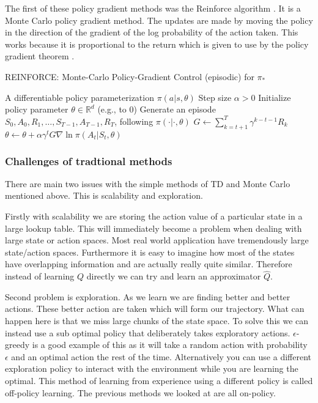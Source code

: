 The first of these policy gradient methods was the Reinforce algorithm \cite{williamsSimpleStatisticalGradientfollowing1992}. It is a Monte Carlo policy gradient method. The updates are made by moving the policy in the direction of the gradient of the log probability of the action taken. This works because it is proportional to the return which is given to use by the policy gradient theorem \cite{suttonPolicyGradientMethods1999}.

\begin{algorithm}
\caption{REINFORCE: Monte-Carlo Policy-Gradient Control (episodic) for $\pi_*$}
\begin{algorithmic}[1]
\Require A differentiable policy parameterization $\pi(a|s, \theta)$
\Require Step size $\alpha > 0$
\State Initialize policy parameter $\theta \in \mathbb{R}^d$ (e.g., to 0)
\Loop
  \State Generate an episode $S_0, A_0, R_1, \ldots, S_{T-1}, A_{T-1}, R_T$, following $\pi(\cdot|\cdot, \theta)$
    \State $G \leftarrow \sum_{k=t+1}^{T} \gamma^{k-t-1} R_k$
    \State $\theta \leftarrow \theta + \alpha \gamma^t G \nabla \ln \pi(A_t|S_t, \theta)$
  \EndFor
\EndLoop
\end{algorithmic}
\end{algorithm}

\subsubsection{Challenges of tradtional methods}

There are main two issues with the simple methods of TD and Monte Carlo mentioned above. This is scalability and exploration.

Firstly with scalability we are storing the action value of a particular state in a large lookup table. This will immediately become a problem when dealing with large state or action spaces. Most real world application have tremendously large state/action spaces. Furthermore it is easy to imagine how most of the states have overlapping information and are actually really quite similar. Therefore instead of learning $Q$ directly we can try and learn an approximator $\hat{Q}$.

Second problem is exploration. As we learn we are finding better and better actions. These better action are taken which will form our trajectory. What can happen here is that we miss large chunks of the state space. To solve this we can instead use a sub optimal policy that deliberately takes exploratory actions. $\epsilon$-greedy is a good example of this as it will take a random action with probability $\epsilon$ and an optimal action the rest of the time. Alternatively you can use a different exploration policy to interact with the environment while you are learning the optimal. This method of learning from experience using a different policy is called off-policy learning. The previous methods we looked at are all on-policy.

